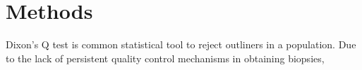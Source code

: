 \chapter{Methods}

Dixon's Q test is common statistical tool to reject outliners in a population. Due to the lack of persistent quality control mechanisms in obtaining biopsies, 